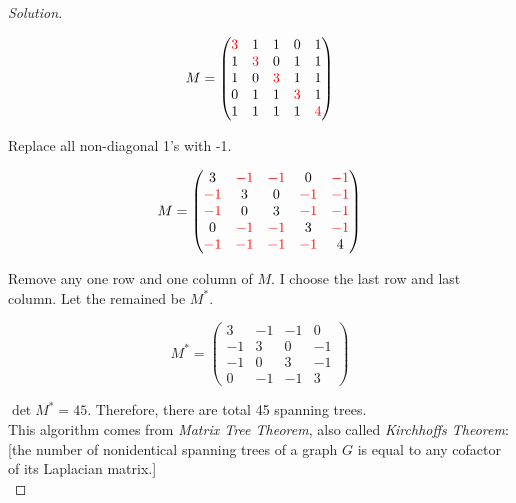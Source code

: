 \begin{proof} [Solution]
	\begin{center}
		\begin{equation*}
			M = \begin{pmatrix} 
				{\color{red}3} & 1 & 1 & 0 & 1 \\
				1 & {\color{red}3} & 0 & 1 & 1 \\
				1 & 0 & {\color{red}3} & 1 & 1 \\
				0 & 1 & 1 & {\color{red}3} & 1 \\
				1 & 1 & 1 & 1 & {\color{red}4}
			\end{pmatrix} 
		\end{equation*}
	\end{center}
	Replace all non-diagonal 1’s with -1.
	\begin{center}
		\begin{equation*}
			M = \begin{pmatrix} 
				3 & {\color{red}-1} & {\color{red}-1} & 0 & {\color{red}-1} \\
				{\color{red}-1} & 3 & 0 & {\color{red}-1} & {\color{red}-1} \\
				{\color{red}-1} & 0 & 3 & {\color{red}-1} & {\color{red}-1} \\
				0 & {\color{red}-1} & {\color{red}-1} & 3 & {\color{red}-1} \\
				{\color{red}-1} & {\color{red}-1} & {\color{red}-1} & {\color{red}-1} & 4
			\end{pmatrix} 
		\end{equation*}
	\end{center}
	Remove any one row and one column of $M$. I choose the last row and last column. Let the remained be $M^*$.
	\begin{center}
		\begin{equation*}
			M^* = \begin{pmatrix} 
				3 & -1 & -1 & 0 \\
				-1 & 3 & 0 & -1 \\
				-1 & 0 & 3 & -1 \\
				0 & -1 & -1 & 3
			\end{pmatrix} 
		\end{equation*}
	\end{center}
	$\det M^* = 45$. Therefore, there are total 45 spanning trees.\\
	This algorithm comes from \textit{Matrix Tree Theorem}, also called \textit{Kirchhoff\textquotesingle s Theorem}: [the number of nonidentical spanning trees of a graph $G$ is equal to any cofactor of its Laplacian matrix.]\\
\end{proof}
